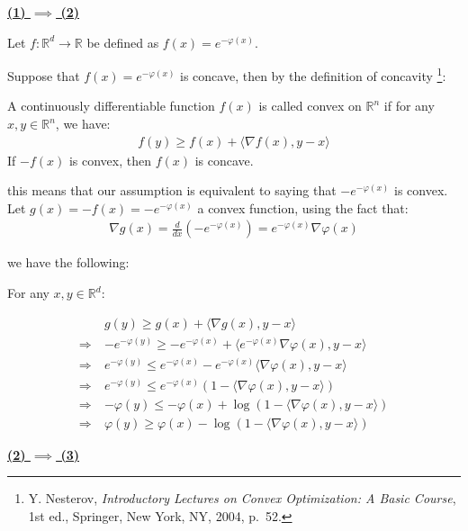 \documentclass{article}
\begin{document}
\textbf{\underline{(1) $\implies$ (2)}}
\bigskip

Let $f: \mathbb{R}^d \to \mathbb{R}$ be defined as $f(x) = e^{-\varphi(x)}$.
\bigskip

Suppose that $f(x) = e^{-\varphi(x)}$ is concave, then by the definition of concavity
\footnote{Y. Nesterov, \textit{Introductory Lectures on Convex Optimization: A Basic Course}, 1st ed., Springer, New York, NY, 2004, p.~52.}:

\begin{tcolorbox}[bluebox, title = Convex]
    A continuously differentiable function $f(x)$ is called convex on $\mathbb{R}^n$ if for any $x, y \in \mathbb{R}^n$, we have:
    \begin{align*}
        f(y) \geq f(x) + \langle \nabla f(x), y - x \rangle
    \end{align*}
    If $-f(x)$ is convex, then $f(x)$ is concave.
\end{tcolorbox}

this means that our assumption is equivalent to saying that $-e^{-\varphi(x)}$ is convex. 
Let $g(x) = -f(x) = -e^{-\varphi(x)}$ a convex function, 
using the fact that:
\begin{align*}
    \nabla g(x) = \frac{d}{dx} (-e^{-\varphi(x)}) = e^{-\varphi(x)} \nabla \varphi(x)
\end{align*}

we have the following:
\bigskip

For any $x, y \in \mathbb{R}^d$:

\begin{align*}
    &g(y) \geq g(x) + \langle \nabla g(x), y - x \rangle \\
    \Rightarrow \ &-e^{-\varphi(y)} \geq -e^{-\varphi(x)} + \langle e^{-\varphi(x)} \nabla \varphi(x), y - x \rangle \\
    \Rightarrow \ &e^{-\varphi(y)} \leq e^{-\varphi(x)} - e^{-\varphi(x)} \langle \nabla \varphi(x), y - x \rangle \\
    \Rightarrow \ &e^{-\varphi(y)} \leq e^{-\varphi(x)} (1 - \langle \nabla \varphi(x), y - x \rangle) \\
    \Rightarrow \ &- \varphi(y) \leq -\varphi(x) + \log (1 - \langle \nabla \varphi(x), y - x \rangle) \\
    \Rightarrow \ &\varphi(y) \geq \varphi(x) - \log (1 - \langle \nabla \varphi(x), y - x \rangle)
\end{align*}

\textbf{\underline{(2) $\implies$ (3)}}
\bigskip
\end{document}
